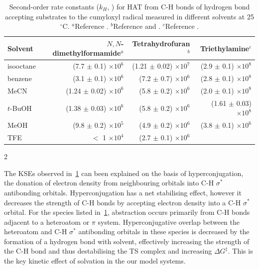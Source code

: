 \begin{table}[htb]
{\footnotesize
\centering
  \begin{tabular}{l r r r}
    Solvent & $N,N$-dimethylformamide$^a$ & Tetrahydrofuran$^b$ & Triethylamine$^c$ \\
\toprule
\toprule
    isooctane & (7.7 $\pm$ 0.1) $\times 10^6$ & (1.21 $\pm$ 0.02) $\times 10^7$ & \rule{0pt}{3ex} (2.9 $\pm$ 0.1) $\times 10^8$  \\
    benzene & (3.1 $\pm$ 0.1) $\times 10^6$ & (7.2 $\pm$ 0.7) $\times 10^6$ & (2.8 $\pm$ 0.1) $\times 10^8$ \\
    MeCN & (1.24 $\pm$ 0.02) $\times 10^6$ & (5.8 $\pm$ 0.2) $\times 10^6$ & (2.0 $\pm$ 0.1) $\times 10^8$ \\
    $t$-BuOH & (1.38 $\pm$ 0.03) $\times 10^6$ & (5.8 $\pm$ 0.2) $\times 10^6$ & (1.61 $\pm$ 0.03) $\times 10^8$ \\
    MeOH & (9.8 $\pm$ 0.2) $\times 10^5$ & (4.9 $\pm$ 0.2) $\times 10^6$ & (3.8 $\pm$ 0.1) $\times 10^6$ \\
    TFE & $<$ 1 $\times 10^4$ & (2.7 $\pm$ 0.1) $\times 10^6$ & \\
  \end{tabular}
  \caption[Summary of second-order rate constants for HAT from C-H bonds for
  hydrogen bond accepting substrates from the cumyloxyl radical.]{Second-order
    rate constants ($k_H$, \Ms) for HAT from C-H bonds of hydrogen bond
    accepting substrates to the cumyloxyl radical measured in different
    solvents at 25 $^{\circ}$C. $^a$Reference
    . $^b$Reference  and
    . $^c$Reference .}
2\label{tab:kse}
}
\end{table}


The KSEs observed in~\ref{tab:kse} can been explained on the basis of
hyperconjugation, the donation of electron density from neighbouring orbitals
into C-H $\sigma^*$ antibonding orbitals. Hyperconjugation has a net stabilising
effect, however it decreases the strength of C-H bonds by accepting electron
density into a C-H $\sigma^*$ orbital. For the species listed in~\ref{tab:kse},
abstraction occurs primarily from C-H bonds adjacent to a heteroatom or $\pi$
system. Hyperconjugative overlap between the heteroatom and C-H $\sigma^*$
antibonding orbitals in these species is decreased by the formation of a
hydrogen bond with solvent, effectively increasing the strength of the C-H bond
and thus destabilising the TS complex and increasing $\Delta G^{\ddagger}$. This
is the key kinetic effect of solvation in the our model systems.


